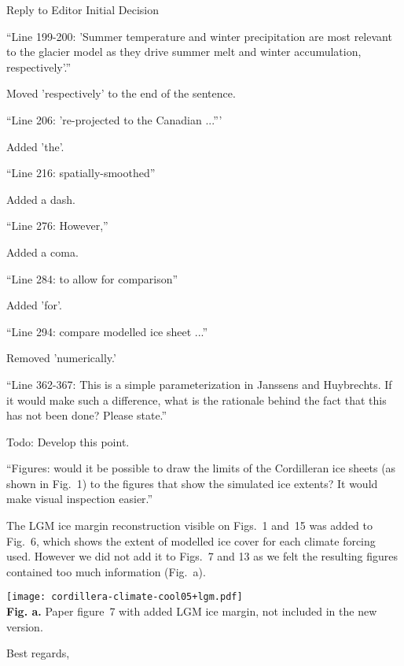 \documentclass{letter}
\newcommand{\rev}[0]{\color{blue!50!black}\it}
\newcommand{\revpoint}[1]{{\rev\item``#1''}}
\newcommand{\todo}[1]{\textcolor{red!50!black}{Todo: #1}}
\begin{document}
\begin{letter}{Reply to Editor Initial Decision}
\begin{itemize}
\revpoint{Line 199-200: 'Summer temperature and winter precipitation are most relevant to the glacier model as they drive summer melt and winter accumulation, respectively'.}

Moved 'respectively' to the end of the sentence.

\revpoint{Line 206: 're-projected to the Canadian ...'}

Added 'the'.

\revpoint{Line 216: spatially-smoothed}

Added a dash.

\revpoint{Line 276: However,}

Added a coma.

\revpoint{Line 284: to allow for comparison}

Added 'for'.

\revpoint{Line 294: compare modelled ice sheet ...}

Removed 'numerically.'

\revpoint{Line 362-367: This is a simple parameterization in Janssens and Huybrechts. If it would make such a difference, what is the rationale behind the fact that this has not been done? Please state.}

\todo{Develop this point.}

\revpoint{Figures: would it be possible to draw the limits of the Cordilleran ice sheets (as shown in Fig.~1) to the figures that show the simulated ice extents? It would make visual inspection easier.}

The LGM ice margin reconstruction visible on Figs.~1 and~15 was added to Fig.~6, which shows the extent of modelled ice cover for each climate forcing used. However we did not add it to Figs.~7 and 13 as we felt the resulting figures contained too much information (Fig.~a).

\end{itemize}

\begin{center}
	\texttt{[image: cordillera-climate-cool05+lgm.pdf]}\\
	\textbf{Fig. a.} Paper figure~7 with added LGM ice margin, not included in the new version.
\end{center}


\closing{Best regards,}

\end{letter}
\end{document}
